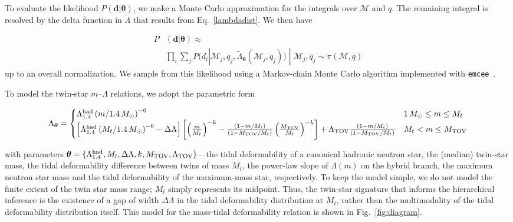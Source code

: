 \documentclass[aps,prd,twocolumn,superscriptaddress,nofootinbib]{revtex4-1}
\newcommand{\Msun}{\ensuremath{\,M_{\odot}}}
\begin{document}
To evaluate the likelihood $P(\boldsymbol{d}|\boldsymbol{\theta})$, we make a Monte Carlo approximation for the integrals over $\mathcal{M}$ and $q$. The remaining integral is resolved by the delta function in $\tilde{\Lambda}$ that results from Eq.~\eqref{lambdadist}. We then have

\begin{align}
    P&(\boldsymbol{d}|\boldsymbol{\theta}) \approx \nonumber \\ 
    &\prod_i \sum_j P(d_i | \mathcal{M}_j,q_j,\tilde{\Lambda}_{\boldsymbol{\theta}}(\mathcal{M}_j,q_j)) \; | \; \mathcal{M}_j, q_j \sim \pi(\mathcal{M},q)
\end{align}
up to an overall normalization. We sample from this likelihood using a Markov-chain Monte Carlo algorithm implemented with \texttt{emcee}~\cite{Foreman-MackeyHogg2013}.

To model the twin-star $m$--$\Lambda$ relations, we adopt the parametric form

\begin{widetext}
\begin{equation}
    \Lambda_{\boldsymbol{\theta}} = \begin{cases} \Lambda_{1.4}^{\rm had} \left(m/1.4 \Msun\right)^{-6} & 1\Msun \leq m \leq M_t \\
    \left[\Lambda_{1.4}^{\rm had} \left(M_t/1.4 \Msun\right)^{-6} - \Delta\Lambda\right] \left[\left(\frac{m}{M_t}\right)^{-k} - \frac{(1-m/M_t)}{(1-M_{\rm TOV}/M_t)} \left(\frac{M_{\rm TOV}}{M_t}\right)^{-k}\right] +\Lambda_{\rm TOV} \frac{(1-m/M_t)}{(1-M_{\rm TOV}/M_t)} & M_t < m \leq M_{\rm TOV} \\
    \end{cases}
\label{fit}
\end{equation}
\end{widetext}
with parameters $\boldsymbol{\theta} = \lbrace \Lambda_{1.4}^{\rm had}, M_{t}, \Delta\Lambda, k, M_{\rm TOV}, \Lambda_{\rm TOV} \rbrace$---the tidal deformability of a canonical hadronic neutron star, the (median) twin-star mass, the tidal deformability difference between twins of mass $M_t$, the power-law slope of $\Lambda(m)$ on the hybrid branch, the maximum neutron star mass and the tidal deformability of the maximum-mass star, respectively. To keep the model simple, we do not model the finite extent of the twin star mass range; $M_{t}$ simply represents its midpoint. Thus, the twin-star signature that informs the hierarchical inference is the existence of a gap of width $\Delta\Lambda$ in the tidal deformability distribution at $M_{t}$, rather than the multimodality of the tidal deformability distribution itself. This model for the mass-tidal deformability relation is shown in Fig.~\ref{fig:diagram}.
\end{document}
